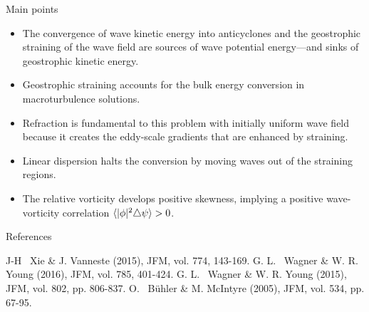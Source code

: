 \documentclass[final]{beamer}
\begin{document}
\begin{frame}[t]
\begin{columns}[t]
\begin{column}{0.55\textwidth}
\begin{columns}
\begin{column}{0.475\textwidth}
{\begin{alertblock}{Main points}
                          \begin{itemize}
                              \item The convergence of wave kinetic energy into
                                    anticyclones and the geostrophic straining of
                                    the wave field are sources of wave potential
                                    energy---and sinks of geostrophic kinetic energy.
                              \item Geostrophic straining accounts for the bulk
                                    energy conversion in macroturbulence solutions.
                              \item Refraction is fundamental to this problem with
                                    initially uniform wave field because
                                    it creates the  eddy-scale gradients that are
                                    enhanced by straining.
                              \item Linear dispersion halts the conversion by moving
                                    waves out of the straining regions.
                              \item The relative vorticity develops
                                    positive skewness, implying a positive
                                    wave-vorticity correlation $\langle|\phi|^2\triangle\psi\rangle>0$.
                          \end{itemize}

                      \end{alertblock}
                      }

                          \begin{block}{References}
                            \small{\begin{thebibliography}{99}
                             J-H~ Xie \& J. Vanneste (2015), JFM,
                                            vol. 774, 143-169.
                             G. L.~ Wagner \& W. R. Young (2016), JFM,
                                            vol. 785, 401-424.
                             G. L.~ Wagner \& W. R. Young (2015), JFM,
                                            vol. 802, pp. 806-837.
                             O.~ B{\"u}hler \& M. McIntyre (2005), JFM,
                                            vol. 534, pp. 67-95.

                            \end{thebibliography}}


\end{block}
\end{column}
\end{columns}
\end{column}
\end{columns}
\end{frame}
\end{document}
